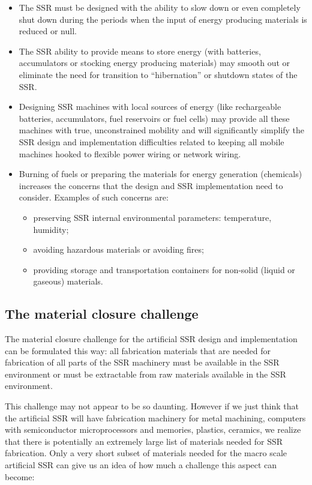 \begin{itemize}
\item The SSR must be designed with the ability to slow down or even
completely shut down during the periods when the input of energy
producing materials is reduced or null.
\item The SSR ability to provide means to store energy (with batteries,
accumulators or stocking energy producing materials) may smooth out or
eliminate the need for transition to “hibernation” or shutdown states
of the SSR.
\item Designing SSR machines with local sources of energy (like
rechargeable batteries, accumulators, fuel reservoirs or fuel cells)
may provide all these machines with true, unconstrained mobility and
will significantly simplify the SSR design and implementation
difficulties related to keeping all mobile machines hooked to flexible
power wiring or network wiring.
\item Burning of fuels or preparing the materials for energy generation
(chemicals) increases the concerns that the design and SSR
implementation need to consider. Examples of such concerns are: 

\begin{itemize}
\item preserving SSR internal environmental parameters: temperature,
humidity; 
\item avoiding hazardous materials or avoiding fires;
\item providing storage and transportation containers for non-solid
(liquid or gaseous) materials.
\end{itemize}
\end{itemize}

\subsection[The material closure challenge]{The material closure challenge}

The material closure challenge
for the artificial SSR design and implementation can be formulated this
way: all fabrication materials that are needed for fabrication of all
parts of the SSR machinery must be available in the SSR environment or
must be extractable from raw materials available in the SSR
environment.

This challenge may not appear to be so daunting. However if we just
think that the artificial SSR will have fabrication machinery for metal
machining, computers with semiconductor microprocessors and memories,
plastics, ceramics, we realize that there is potentially an extremely
large list of materials needed for SSR fabrication. Only a very short
subset of materials needed for the macro scale artificial
SSR can give us an idea of how much a challenge this aspect can become:

